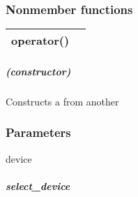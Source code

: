 \documentclass[letterpaper,10pt,english]{sphinxmanual}
\begin{document}
\subsubsection*{Nonmember functions}


\begin{savenotes}\sphinxattablestart
\centering
\begin{tabulary}{\linewidth}[t]{|T|T|}
\hline

operator()
&\\
\hline
\end{tabulary}
\par
\sphinxattableend\end{savenotes}


\subparagraph{(constructor)}
\label{\detokenize{programming-interface/runtime/device-selector:constructor}}
\begin{sphinxVerbatim}[commandchars=\\\{\}]
  
\end{sphinxVerbatim}

\begin{sphinxVerbatim}[commandchars=\\\{\}]
   
\end{sphinxVerbatim}

Constructs a  from another 
\subsubsection*{Parameters}

\begin{DUlineblock}{0em}
\item[]  \sphinxhyphen{} device
\end{DUlineblock}


\subparagraph{select\_device}
\label{\detokenize{programming-interface/runtime/device-selector:select-device}}
\begin{sphinxVerbatim}[commandchars=\\\{\}]
  
\end{sphinxVerbatim}
\end{document}
